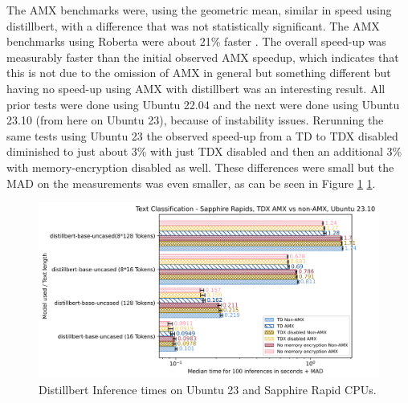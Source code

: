 The AMX benchmarks were, using the geometric mean, similar in speed using distillbert, with a difference that was not statistically significant. The AMX benchmarks using Roberta were about 21\% faster . The overall speed-up was measurably faster than the initial observed AMX speedup, which indicates that this is not due to the omission of AMX in general but something different but having no speed-up using AMX with distillbert was an interesting result. 
All prior tests were done using Ubuntu 22.04 and the next were done using Ubuntu 23.10 (from here on Ubuntu 23), because of instability issues. Rerunning the same tests using Ubuntu 23 the observed speed-up from a TD to TDX disabled diminished to just about 3\% with just TDX disabled and then an additional 3\% with memory-encryption disabled as well. These differences were small but the MAD on the measurements was even smaller, as can be seen in Figure \ref{fig:distillbertAMXUbuntu23} \ref{fig:distillbertAMXUbuntu23}. 
\begin{figure}
   \centering
       \includegraphics[width=.95\textwidth]{figures/inferencedistillberMADUbuntu23AMX.png} 
 \caption{Distillbert Inference times on Ubuntu 23 and Sapphire Rapid CPUs.}
 \label{fig:distillbertAMXUbuntu23}
\end{figure}
